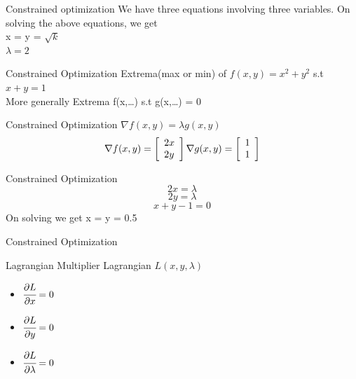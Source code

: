\documentclass{beamer}
\begin{document}
\begin{frame}{Constrained optimization}
    We have three equations involving three variables. 
    On solving the above equations, we get\\
    x = y = $\sqrt{k}$\\
    $\lambda = 2$\\
\end{frame}

\begin{frame}{Constrained Optimization}
    Extrema(max or min) of $f(x,y) = x^{2} + y^{2}$ s.t $x + y = 1$\\
    
    \vspace{5em}
    More generally Extrema f(x,\dots) s.t g(x,\dots) = 0
\end{frame}

\begin{frame}{Constrained Optimization}
    $\nabla f(x,y) = \lambda g(x,y)$ \\
    \vspace{1em}
    $$
   \nabla f(x, y)=\left[\begin{array}{l}
   	{2 x} \\
   	{2 y}
   \end{array}\right] 
    \vspace{1em} 
    \nabla g(x, y)=\left[\begin{array}{l}
    	{1} \\
    	{1}
    \end{array}\right]
    $$
\end{frame}

\begin{frame}{Constrained Optimization}
    \begin{equation}
        2x=\lambda
    \end{equation}
    \begin{equation}
        2y=\lambda
    \end{equation}
    \begin{equation}
        x + y - 1 = 0
    \end{equation}
    On solving we get x = y = 0.5
\end{frame}

\begin{frame}{Constrained Optimization}

\end{frame}

\begin{frame}{Lagrangian Multiplier}
    Lagrangian $L(x,y,\lambda)$
    \begin{itemize}
        \item $\cfrac{\partial L}{\partial x} = 0$
        \item $\cfrac{\partial L}{\partial y} = 0$
        \item $\cfrac{\partial L}{\partial \lambda} = 0$
    \end{itemize}
    
\end{frame}
\end{document}
